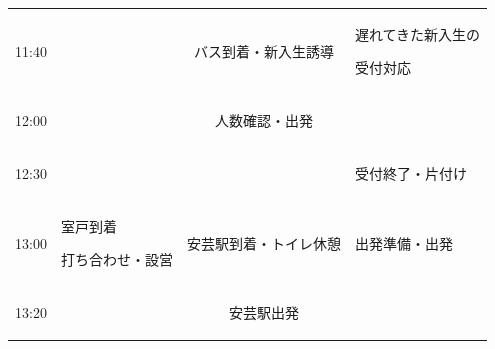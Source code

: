 \begin{longtable}[c]{|p{}|p{}|p{}|p{}|p{}|}
  \begin{tpacol}
    11:40
  \end{tpacol}&
  \begin{tpbcol}
    
  \end{tpbcol}&
  \multicolumn{2}{c|}{バス到着・新入生誘導}&
  \begin{tpecol}
    遅れてきた新入生の\par
    受付対応
  \end{tpecol}\\
  \hdashline

  \begin{tpacol}
    12:00
  \end{tpacol}&
  \begin{tpbcol}
    
  \end{tpbcol}&
  \multicolumn{2}{c|}{人数確認・出発} &
  \begin{tpecol}
    
  \end{tpecol}\\
  \hdashline

  \begin{tpacol}
    12:30
  \end{tpacol}&
  \begin{tpbcol}
    
  \end{tpbcol}&
  \multicolumn{2}{c|}{} &
  \begin{tpecol}
    受付終了・片付け
  \end{tpecol}\\
  \hdashline

  \begin{tpacol}
    13:00
  \end{tpacol}&
  \begin{tpbcol}
    室戸到着 \par
    打ち合わせ・設営
  \end{tpbcol}&
  \multicolumn{2}{c|}{安芸駅到着・トイレ休憩} &
  \begin{tpecol}
    出発準備・出発
  \end{tpecol}\\
  \hdashline

  \begin{tpacol}
    13:20
  \end{tpacol}&
  \begin{tpbcol}
    
  \end{tpbcol}&
  \multicolumn{2}{c|}{安芸駅出発} &
  \begin{tpecol}
    

\end{tpecol}
\end{longtable}
